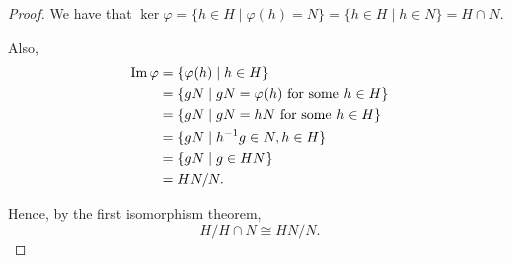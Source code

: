 \begin{proof}
    We have that $\ker \varphi = \{h \in H \mid \varphi(h) = N \} = \{h \in H \mid h \in N \} = H \cap N.$

    Also, 
    \begin{align*}
        \operatorname{Im} \varphi &= \{\varphi(h) \mid h \in H\} \\
        &= \{gN \mid gN=\varphi(h) \text{ for some } h \in H\} \\
        &= \{gN \mid gN = hN \text{ for some } h \in H \} \\
        &= \{gN \mid h^{-1}g \in N, h\in H\} \\
        &= \{gN \mid g\in HN\} \\
        &= HN/N.
    \end{align*}

    Hence, by the first isomorphism theorem,
    $$
    H/H\cap N \cong HN/N.
    $$
\end{proof}







